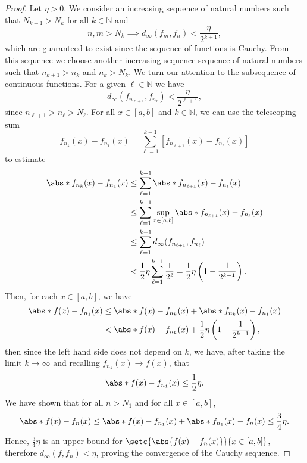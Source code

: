 \begin{proof}
    Let \(\eta > 0\). We consider an increasing sequence of natural numbers  such that \(N_{k + 1} > N_k\) for all \(k \in \mathbb{N}\) and
    \begin{equation*}
        n, m > N_k \implies d_\infty(f_m, f_n) < \frac{\eta}{2^{k+1}},
    \end{equation*}
    which are guaranteed to exist since the sequence of functions is Cauchy. From this sequence we choose another increasing sequence sequence of natural numbers  such that \(n_{k+1} > n_k\) and \(n_k > N_k\). We turn our attention to the subsequence  of continuous functions. For a given \(\ell \in \mathbb{N}\) we have
    \begin{equation*}
        d_\infty(f_{n_{\ell + 1}}, f_{n_{\ell}}) < \frac{\eta}{2^{\ell + 1}},
    \end{equation*}
    since \(n_{\ell+1} > n_{\ell} > N_\ell\). For all \(x \in [a,b]\)  and \(k \in \mathbb{N}\), we can use the telescoping sum
    \begin{equation*}
        f_{n_k}(x) - f_{n_1}(x) = \sum_{\ell = 1}^{k - 1} [f_{n_{\ell + 1}}(x) - f_{n_{\ell}}(x)]
    \end{equation*}
    to estimate
    \begin{align*}
        \abs*{f_{n_k}(x) - f_{n_1}(x)} &\leq \sum_{\ell = 1}^{k - 1} \abs*{f_{n_{\ell + 1}}(x) - f_{n_\ell}(x)}\\
                                       &\leq \sum_{\ell = 1}^{k - 1} \sup_{x \in [a,b]}\abs*{f_{n_{\ell + 1}}(x) - f_{n_\ell}(x)}\\
                                       &\leq \sum_{\ell = 1}^{k - 1} d_\infty(f_{n_{\ell+1}}, f_{n_\ell})\\
                                         &< \frac12 \eta \sum_{\ell = 1}^{k-1}\frac{1}{2^\ell} = \frac12 \eta \left(1 - \frac{1}{2^{k - 1}}\right).
    \end{align*}
    Then, for each \(x \in [a,b]\), we have
    \begin{align*}
        \abs*{f(x) - f_{n_1}(x)} &\leq \abs*{f(x) - f_{n_k}(x)} + \abs*{f_{n_k}(x) - f_{n_1}(x)}\\
                                 &< \abs*{f(x) - f_{n_k}(x)} + \frac12 \eta\left(1 - \frac1{2^{k-1}}\right),
    \end{align*}
    then since the left hand side does not depend on \(k\), we have, after taking the limit \(k \to \infty\) and recalling \(f_{n_k}(x) \to f(x)\), that
    \begin{equation*}
        \abs*{f(x) - f_{n_1}(x)} \leq \frac12 \eta.
    \end{equation*}
    We have shown that for all \(n > N_1\) and for all \(x \in [a,b]\),
    \begin{equation*}
        \abs*{f(x) - f_n(x)} \leq \abs*{f(x) - f_{n_1}(x)} + \abs*{f_{n_1}(x) - f_n(x)} \leq \frac34 \eta.
    \end{equation*}
    Hence, \(\frac34\eta\) is an upper bound for \(\setc{\abs{f(x)-f_n(x)}}{x \in [a,b]}\), therefore \(d_\infty(f, f_n) < \eta\), proving the convergence of the Cauchy sequence.
\end{proof}

